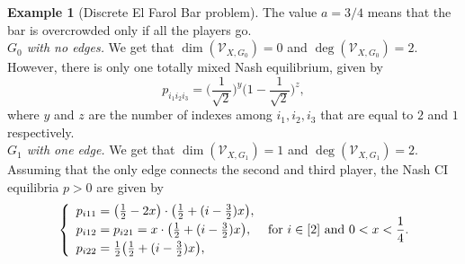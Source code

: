 \documentclass[11pt]{amsart}
\numberwithin{equation}{section}
\theoremstyle{plain}
\numberwithin{theorem}{section}
\theoremstyle{definition}
\newtheorem{example}[theorem]{Example}
\begin{document}
\begin{example}[Discrete El Farol Bar problem]
\noindent The value $a=3/4$ means that the bar is overcrowded only if all the players go. \\
\indent \emph{$G_0$ with no edges.} We get that  $\dim(\mathcal V_{X,G_0})=0$ and $\deg(\mathcal V_{X,G_0})=2$. However, there is only one totally mixed Nash equilibrium, given by $$p_{i_1i_2i_3}=\big(\frac1{\sqrt2}\big)^y\big(1-\frac1{\sqrt2}\big)^z,$$ where $y$ and $z$ are the number of indexes among $i_1,i_2,i_3$ that are equal to $2$ and $1$ respectively.\\
\indent \emph{$G_1$ with one edge.} We get that  $\dim(\mathcal V_{X,G_1})=1$ and $\deg(\mathcal V_{X,G_1})=2$. Assuming that the only edge connects the second and third player, the Nash CI equilibria $p>0$ are given by 
    $$\left\{\begin{array}{l}
    \vspace*{1mm}
     p_{i11}=\big(\frac12-2x\big)\cdot\big(\frac12+(i-\frac32)x\big),\\
     \vspace*{1mm}
      p_{i12}=p_{i21}=x\cdot\big(\frac12+(i-\frac32)x\big),\\
      p_{i22}=\frac12\big(\frac12+(i-\frac32)x\big),
\end{array}\right.\text{ for } i\in[2]\text{ and }0<x<\frac14.$$


\end{example}
\end{document}

